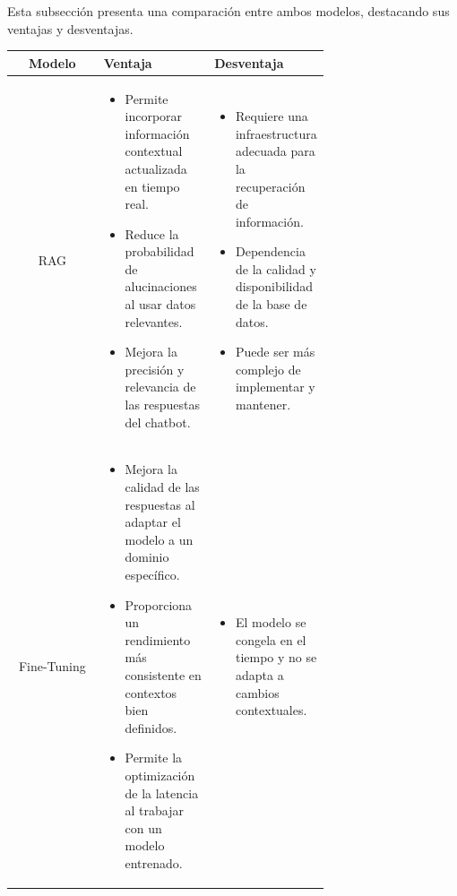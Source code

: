   Esta subsección presenta una comparación entre ambos modelos, destacando sus ventajas y desventajas.
  \begin{table}[ht]
    \centering
    \begin{tabular}{|c|p{0.35\linewidth}|p{0.35\linewidth}|}
        \hline
        \textbf{Modelo} & \textbf{Ventaja} & \textbf{Desventaja} \\
        \hline
        RAG & 
        \begin{raggedright}
        \begin{itemize}
            \item Permite incorporar información contextual actualizada en tiempo real.
            \item Reduce la probabilidad de alucinaciones al usar datos relevantes.
            \item Mejora la precisión y relevancia de las respuestas del chatbot.
        \end{itemize} 
        \end{raggedright} & 
        \begin{raggedright}
        \begin{itemize}
            \item Requiere una infraestructura adecuada para la recuperación de información.
            \item Dependencia de la calidad y disponibilidad de la base de datos.
            \item Puede ser más complejo de implementar y mantener.
        \end{itemize} 
        \end{raggedright} \\
        \hline
        Fine-Tuning & 
        \begin{raggedright}
        \begin{itemize}
            \item Mejora la calidad de las respuestas al adaptar el modelo a un dominio específico.
            \item Proporciona un rendimiento más consistente en contextos bien definidos.
            \item Permite la optimización de la latencia al trabajar con un modelo entrenado.
        \end{itemize} 
        \end{raggedright} & 
        \begin{raggedright}
        \begin{itemize}
            \item El modelo se congela en el tiempo y no se adapta a cambios contextuales.

\end{itemize}
\end{raggedright}
\end{tabular}
\end{table}
